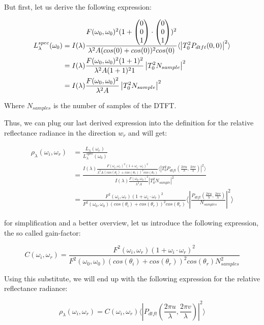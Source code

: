 But first, let us derive the following expression:

\begin{align}
L_\lambda^{spec}(\omega_0) 
& = I(\lambda) \frac{F(\omega_0, \omega_0)^2 (1+\colvec[0]{0}{1}\cdot\colvec[0]{0}{1})^2}{\lambda^2 A (cos(0)+cos(0))^2 cos(0)} \langle \left|T_0^2 P_{dtft}(0,0)  \right|^2\rangle \nonumber \\
& = I(\lambda) \frac{F(\omega_0, \omega_0)^2 (1+1)^2}{\lambda^2 A (1+1)^2 1}\left| T_0^2 N_{sample} \right|^2 \nonumber \\
& = I(\lambda) \frac{F(\omega_0, \omega_0)^2}{\lambda^2 A}\left| T_0^2 N_{sample} \right|^2 
\end{align}

Where $N_{samples}$ is the number of samples of the DTFT.

Thus, we can plug our last derived expression into the definition for the relative reflectance radiance in the direction $w_r$ and will get:

\begin{align}
\rho_\lambda(\omega_i,\omega_r)
& = \frac{L_\lambda(\omega_r)}{L_\lambda^{spec}(\omega_0)} \nonumber \\
& = \frac{I(\lambda) \frac{F(\omega_i, \omega_r)^2 (1 + \omega_i \cdot \omega_r)^2}{\lambda^2 A (cos(\theta_i)+cos(\theta_r))^2 cos(\theta_r)} \langle \left|T_0^2 P_{dtft}(\frac{2\pi u}{\lambda}, \frac{2\pi v}{\lambda}) \right|^2\rangle}{I(\lambda) \frac{F(\omega_0, \omega_0)^2}{\lambda^2 A}\left| T_0^2 N_{sample} \right|^2 } \nonumber \\
& = \frac{F^2(\omega_i,\omega_r)(1 + \omega_i \cdot \omega_r)^2}{F^2(\omega_0,\omega_0)(cos(\theta_i)+cos(\theta_r))^2 cos(\theta_r)} \langle \left|\frac{P_{dtft}(\frac{2\pi u}{\lambda}, \frac{2\pi v}{\lambda})}{N_{samples}}\right|^2\rangle
\end{align}

for simplification and a better overview, let us introduce the following expression, the so called gain-factor:

\begin{equation} 
    C(\omega_i,\omega_r) = \frac{F^2(\omega_i,\omega_r)(1 + \omega_i \cdot \omega_r)^2}{F^2(\omega_0,\omega_0)(cos(\theta_i)+cos(\theta_r))^2 cos(\theta_r) N_{samples}^2}
\label{eq:cfact}
\end{equation}

Using this substitute, we will end up with the following expression for the relative reflectance radiance:

\begin{equation}
\rho_\lambda(\omega_i,\omega_r) =  C(\omega_i,\omega_r) \langle \left|P_{dtft}(\frac{2\pi u}{\lambda}, \frac{2\pi v}{\lambda})\right|^2\rangle
\label{eq:cpterm}
\end{equation}

